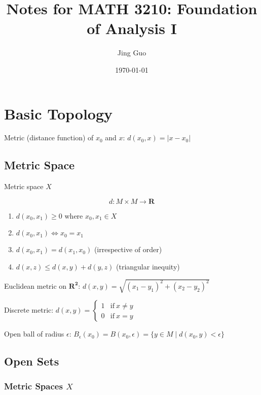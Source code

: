 \documentclass{article}
\title{Notes for MATH 3210: Foundation of Analysis I}
\author{Jing Guo}
\date{\today}
\begin{document}
    \maketitle
    \tableofcontents

    \section{Basic Topology}

        Metric (distance function) of $x_{0}$ and $x$: $d(x_{0}, x) = \lvert x - x_{0} \rvert$

    \subsection{Metric Space}

        Metric space $X$

        \begin{equation}
        d \colon M \times M \to \mathbf{R}
        \end{equation}

        \begin{enumerate}
            \item $d(x_{0}, x_{1}) \geq 0$ where $x_{0}, x_{1} \in X$
            \item $d(x_{0}, x_{1}) \iff x_{0} = x_{1}$
            \item $d(x_{0}, x_{1}) = d(x_{1}, x_{0})$ (irrespective of order)
            \item $d(x, z) \leq d(x, y) + d(y, z)$ (triangular inequity)
        \end{enumerate}

        Euclidean metric on $\mathbf{R^{2}}$:
        $d(x, y) = \sqrt{(x_{1} - y_{1})^{2} + (x_{2} - y_{2})^{2}}$

        Discrete metric: $d(x, y) = \left\{\begin{matrix}
        1 &\mbox{if}\ x \neq y \\
        0 &\mbox{if}\ x = y 
        \end{matrix}\right.$

        Open ball of radius $\epsilon$:
        $B_{\epsilon}(x_{0}) = B(x_{0}, \epsilon) = \{ y \in M \mid d(x_{0}, y) < \epsilon \}$

    \subsection{Open Sets}

        \subsubsection{Metric Spaces $X$}
\end{document}
